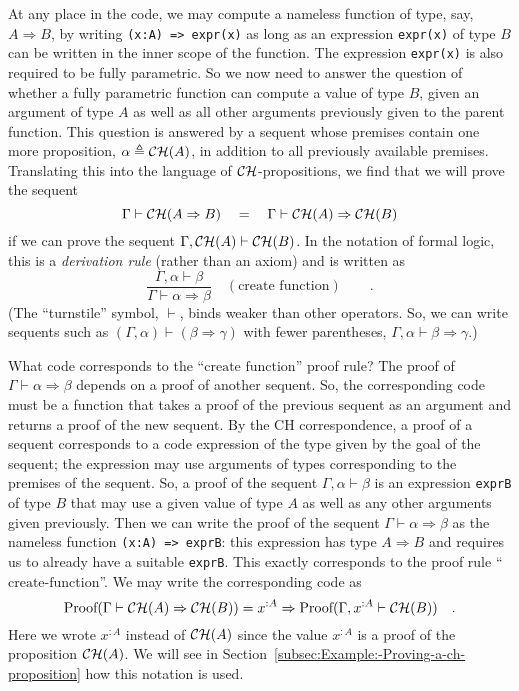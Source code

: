 At any place in the code, we may compute a nameless function of type,
say, $A\Rightarrow B$, by writing \lstinline!(x:A) => expr(x)!
as long as an expression \lstinline!expr(x)!
of type $B$ can be written in the inner scope of the function. The
expression \lstinline!expr(x)!
is also required to be fully parametric. So we now need to answer
the question of whether a fully parametric function can compute a
value of type $B$, given an argument of type $A$ as well as all
other arguments previously given to the parent function. This question
is answered by a sequent whose premises contain one more proposition,
$\alpha\triangleq{\cal CH}(A)$, in addition to all previously available
premises. Translating this into the language of ${\cal CH}$-propositions,
we find that we will prove the sequent 
\[
\Gamma\vdash{\cal CH}(A\Rightarrow B)\quad=\quad\Gamma\vdash{\cal CH}(A)\Rightarrow{\cal CH}(B)
\]
if we can prove the sequent $\Gamma,{\cal CH}(A)\vdash{\cal CH}(B)$.
In the notation of formal logic, this is a \emph{derivation rule}
(rather than an axiom) and is written as
\[
\frac{\Gamma,\alpha\vdash\beta}{\Gamma\vdash\alpha\Rightarrow\beta}\quad(\text{create function})\quad\quad.
\]
(The ``turnstile'' symbol, $\vdash$, binds weaker than other operators.
So, we can write sequents such as $(\Gamma,\alpha)\vdash(\beta\Rightarrow\gamma)$
with fewer parentheses, $\Gamma,\alpha\vdash\beta\Rightarrow\gamma$.)

What code corresponds to the ``$\text{create function}$'' proof
rule? The proof of $\Gamma\vdash\alpha\Rightarrow\beta$ depends on
a proof of another sequent. So, the corresponding code must be a function
that takes a proof of the previous sequent as an argument and returns
a proof of the new sequent. By the CH correspondence, a proof of a
sequent corresponds to a code expression of the type given by the
goal of the sequent; the expression may use arguments of types corresponding
to the premises of the sequent. So, a proof of the sequent $\Gamma,\alpha\vdash\beta$
is an expression \lstinline!exprB!
of type $B$ that may use a given value of type $A$ as well as any
other arguments given previously. Then we can write the proof of the
sequent $\Gamma\vdash\alpha\Rightarrow\beta$ as the nameless function
\lstinline!(x:A) => exprB!:
this expression has type $A\Rightarrow B$ and requires us to already
have a suitable \lstinline!exprB!.
This exactly corresponds to the proof rule ``$\text{create-function}$''.
We may write the corresponding code as
\[
\text{Proof}(\Gamma\vdash{\cal CH}(A)\Rightarrow{\cal CH}(B))=x^{:A}\Rightarrow\text{Proof}(\Gamma,x^{:A}\vdash{\cal CH}(B))\quad.
\]
Here we wrote $x^{:A}$ instead of ${\cal CH}(A)$ since the value
$x^{:A}$ is a proof of the proposition ${\cal CH}(A)$. We will see
in Section~\ref{subsec:Example:-Proving-a-ch-proposition} how this
notation is used.

